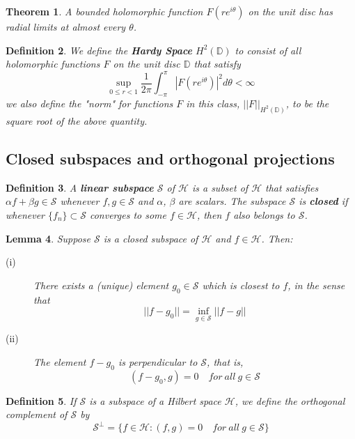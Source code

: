 \documentclass[11pt]{article}
\newtheorem{theorem}{Theorem}[subsection]
\newtheorem{definition}[theorem]{Definition}
\newtheorem{lemma}[theorem]{Lemma}
\begin{document}
\begin{theorem}
    A bounded holomorphic function $F(re^{i\theta})$ on the unit disc has radial limits at almost every $\theta$.
\end{theorem}

\begin{definition}
    We define the \textbf{Hardy Space} $H^2(\mathbb{D})$ to consist of all holomorphic functions $F$ on the unit disc $\mathbb{D}$ that satisfy
    \[\sup_{0\leq r<1}\frac{1}{2\pi}\int_{-\pi}^{\pi}|F(re^{i\theta})|^2d\theta<\infty\]
    we also define the "norm" for functions $F$ in this class, $||F||_{H^2(\mathbb{D})}$, to be the square root of the above quantity.
\end{definition}

\subsection{Closed subspaces and orthogonal projections}
\begin{definition}
    A \textbf{linear subspace} $\mathcal{S}$ of $\mathcal{H}$ is a subset of $\mathcal{H}$ that satisfies $\alpha f+\beta g\in\mathcal{S}$ whenever $f,g\in \mathcal{S}$ and $\alpha$, $\beta$ are scalars. The subspace $\mathcal{S}$ is \textbf{closed} if whenever $\{f_n\}\subset \mathcal{S}$ converges to some $f\in \mathcal{H}$, then $f$ also belongs to $\mathcal{S}$.
\end{definition}

\begin{lemma}
    Suppose $\mathcal{S}$ is a closed subspace of $\mathcal{H}$ and $f\in \mathcal{H}$. Then:
    \begin{description}
        \item[(i)] There exists a (unique) element $g_0\in\mathcal{S}$ which is closest to $f$, in the sense that\[||f-g_0||=\inf_{g\in\mathcal{S}}||f-g||\]
        \item[(ii)] The element $f-g_0$ is perpendicular to $\mathcal{S}$, that is,\[(f-g_0,g)=0\quad for\ all\ g\in \mathcal{S}\]
    \end{description}
\end{lemma}

\begin{definition}
    If $\mathcal{S}$ is a subspace of a Hilbert space $\mathcal{H}$, we define the orthogonal complement of $\mathcal{S}$ by\[\mathcal{S}^\perp=\{f\in\mathcal{H}:(f,g)=0\quad for\ all\ g\in\mathcal{S}\}\]
\end{definition}
\end{document}
